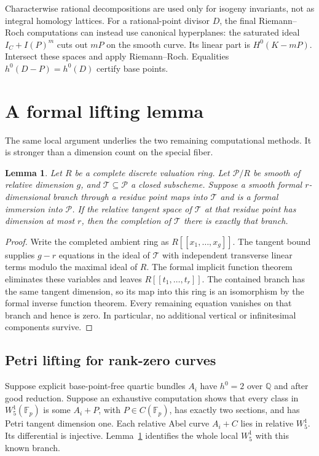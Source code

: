 \documentclass[11pt]{article}
\newcommand{\Q}{\mathbb Q}
\newcommand{\Fp}{\mathbb F_p}
\newtheorem{lemma}[theorem]{Lemma}
\theoremstyle{remark}\newtheorem{remark}[theorem]{Remark}
\begin{document}
Characterwise rational decompositions are used only for isogeny invariants,
not as integral homology lattices. For a rational-point divisor $D$, the
final Riemann--Roch computations can instead use canonical hyperplanes:
the saturated ideal $I_C+I(P)^m$ cuts out $mP$ on the smooth curve.
Its linear part is $H^0(K-mP)$. Intersect these spaces and apply
Riemann--Roch. Equalities $h^0(D-P)=h^0(D)$ certify base points.

\section{A formal lifting lemma}
The same local argument underlies the two remaining computational methods.
It is stronger than a dimension count on the special fiber.
\begin{lemma}\label{lem:formal}
Let $R$ be a complete discrete valuation ring. Let $\mathcal P/R$ be
smooth of relative dimension $g$, and $\mathcal T\subseteq\mathcal P$
a closed subscheme. Suppose a smooth formal $r$-dimensional branch
through a residue point maps into $\mathcal T$ and is a formal immersion
into $\mathcal P$. If the relative tangent space of $\mathcal T$ at
that residue point has dimension at most $r$, then the completion of
$\mathcal T$ there is exactly that branch.
\end{lemma}
\begin{proof}
Write the completed ambient ring as $R[[x_1,\ldots,x_g]]$. The tangent
bound supplies $g-r$ equations in the ideal of $\mathcal T$ with
independent transverse linear terms modulo the maximal ideal of $R$.
The formal implicit function theorem eliminates these variables and
leaves $R[[t_1,\ldots,t_r]]$. The contained branch has the same tangent
dimension, so its map into this ring is an isomorphism by the formal
inverse function theorem. Every remaining equation vanishes on that
branch and hence is zero. In particular, no additional vertical or
infinitesimal components survive.
\end{proof}

\subsection{Petri lifting for rank-zero curves}
Suppose explicit base-point-free quartic bundles $A_i$ have $h^0=2$
over $\Q$ and after good reduction. Suppose an exhaustive computation
shows that every class in $W^1_5(\Fp)$ is some $A_i+P$, with
$P\in C(\Fp)$, has exactly two sections, and has Petri tangent
dimension one. Each relative Abel curve $A_i+C$ lies in relative $W^1_5$.
Its differential is injective. Lemma~\ref{lem:formal} identifies the
whole local $W^1_5$ with this known branch.
\end{document}
